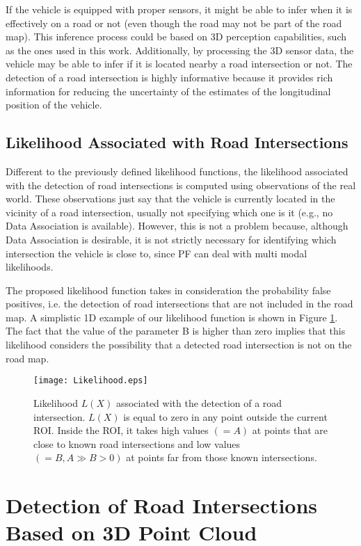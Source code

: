If the vehicle is equipped with proper sensors, it might be able to infer when it is effectively on a road or not (even though the road may not be part of the road map). This inference process could be based on 3D perception capabilities, such as the ones used in this work. Additionally, by processing the 3D sensor data, the vehicle may be able to infer if it is located nearby a road intersection or not. The detection of a road intersection is highly informative because it provides rich information for reducing the uncertainty of the estimates of the longitudinal position of the vehicle.

\subsection{Likelihood Associated with Road Intersections}

Different to the previously defined likelihood functions, the likelihood associated with the detection of road intersections is computed using observations of the real world. These observations just say that the vehicle is currently located in the vicinity of a road intersection, usually not specifying which one is it (e.g., no Data Association is available). However, this is not a problem because, although Data Association is desirable, it is not strictly necessary for identifying which intersection the vehicle is close to, since PF can deal with multi modal likelihoods.

The proposed likelihood function takes in consideration the probability false positives, i.e. the detection of road intersections that are not included in the road map. A simplistic 1D example of our likelihood function is shown in Figure \ref{Fig::Likelihood}. The fact that the value of the parameter B is higher than zero implies that this likelihood considers the possibility that a detected road intersection is not on the road map.

\begin{figure}[t!]
    \centering
    \texttt{[image: Likelihood.eps]}
    \caption{Likelihood $L(X)$ associated with the detection of a road intersection. $L(X)$ is equal to zero in any point outside the current ROI. Inside the ROI, it takes high values $(=A)$ at points that are close to known road intersections and low values $(= B,A\gg B>0)$ at points far from those known intersections.}
    \label{Fig::Likelihood}
\end{figure}

\section{Detection of Road Intersections Based on 3D Point Cloud}


